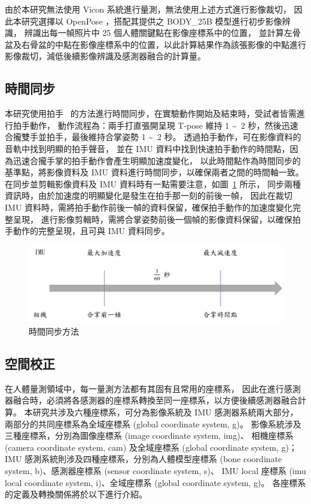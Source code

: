 由於本研究無法使用 Vicon 系統進行量測，無法使用上述方式進行影像裁切，
因此本研究選擇以 OpenPose ，搭配其提供之 BODY\_25B 模型進行初步影像辨識，
辨識出每一幀照片中 25 個人體關鍵點在影像座標系中的位置，
並計算左骨盆及右骨盆的中點在影像座標系中的位置，以此計算結果作為該張影像的中點進行影像裁切，減低後續影像辨識及感測器融合的計算量。

\subsection{時間同步}
本研究使用拍手~\cite{pons2012data} 的方法進行時間同步，在實驗動作開始及結束時，受試者皆需進行拍手動作，
動作流程為：兩手打直張開呈現 T-pose 維持 1 \textasciitilde\ 2 秒，然後迅速合攏雙手並拍手，最後維持合掌姿勢 1 \textasciitilde\ 2 秒。
透過拍手動作，可在影像資料的音軌中找到明顯的拍手聲音，
並在 IMU 資料中找到快速拍手動作的時間點，因為迅速合攏手掌的拍手動作會產生明顯加速度變化，
以此時間點作為時間同步的基準點，將影像資料及 IMU 資料進行時間同步，以確保兩者之間的時間軸一致。
在同步並剪輯影像資料及 IMU 資料時有一點需要注意，如圖~\ref{ch3_fig_timesyn} 所示，
同步兩種資訊時，由於加速度的明顯變化是發生在拍手那一刻的前後一幀，
因此在裁切 IMU 資料時，需將拍手動作前後一幀的資料保留，確保拍手動作的加速度變化完整呈現，
進行影像剪輯時，需將合掌姿勢前後一個幀的影像資料保留，以確保拍手動作的完整呈現，且可與 IMU 資料同步。

\begin{figure}[!ht]
   \centering
   \includegraphics[width=\linewidth]{figure/ch3_fig_timesyn.png}
   \caption[時間同步方法]{時間同步方法}
   \label{ch3_fig_timesyn}
\end{figure}

\subsection{空間校正}
在人體量測領域中，每一量測方法都有其固有且常用的座標系，
因此在進行感測器融合時，必須將各感測器的座標系轉換至同一座標系，以方便後續感測器融合計算。
本研究共涉及六種座標系，可分為影像系統及 IMU 感測器系統兩大部分，兩部分的共同座標系為全域座標系 (global coordinate system, g)。
影像系統涉及三種座標系，分別為圖像座標系 (image coordinate system, img)、
相機座標系 (camera coordinate system, cam) 及全域座標系 (global coordinate system, g)；
IMU 感測系統則涉及四種座標系，分別為人體模型座標系 (bone coordinate system, b)、感測器座標系 (sensor coordinate system, s)、
IMU local 座標系 (imu local coordinate system, i)、全域座標系 (global coordinate system, g)。
各座標系的定義及轉換關係將於以下進行介紹。

